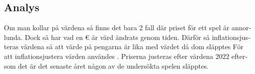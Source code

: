 \documentclass[11p]{article}
\begin{document}
\begin{otherlanguage}{swedish}






    \subsection{Analys}
    Om man kollar på värdena så finns det bara 2 fall där priset för ett spel är annorlunda.
    Dock så har vad en € är värd ändrats genom tiden.
    Därför så inflationsjusteras värdena så att värde på pengarna är lika med värdet då dom släpptes
    För att inflationsjustera värden användes \textcite{Inflation}.
    Priserna justeras efter värdena 2022 eftersom det är det senaste året någon av de undersökta spelen släpptes.
    \begin{table}[htbp]
        \centering
        \setlength\tabcolsep{2pt}
        \begin{tabular}{|c|c|c|}
            \hline


\end{tabular}
\end{table}
\end{otherlanguage}
\end{document}
